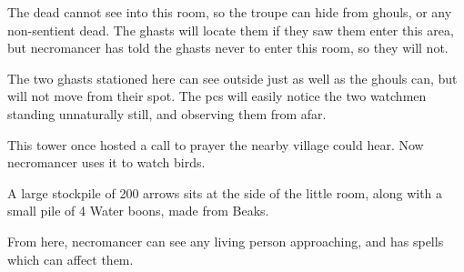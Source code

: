 \begin{multicols}{2}
The dead cannot see into this room, so the troupe can hide from ghouls, or any non-sentient dead.
The ghasts will locate them if they saw them enter this area, but \gls{necromancer} has told the ghasts never to enter this room, so they will not.


The two ghasts stationed here can see outside just as well as the ghouls can, but will not move from their spot.
The \glspl{pc} will easily notice the two watchmen standing unnaturally still, and observing them from afar.


\begin{exampletext}
This tower once hosted a call to prayer the nearby \gls{village} could hear.
Now \gls{necromancer} uses it to watch birds.
\end{exampletext}

A large stockpile of 200 arrows sits at the side of the little room, along with a small pile of 4 Water \glspl{boon}, made from  Beaks.

From here, \gls{necromancer} can see any living person approaching, and has spells which can affect them.


\end{multicols}
